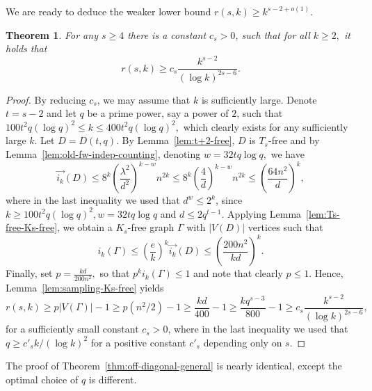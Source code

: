 \documentclass{article}
\theoremstyle{plain}
\newtheorem{theorem}{Theorem}[section]
\theoremstyle{definition}
\newcommand{\fwi}[1]{\overrightarrow{i_{#1}}}
\begin{document}
We are ready to deduce the weaker lower bound $r(s, k) \ge k^{s-2+o(1)}$.

\begin{theorem} \label{thm:s-2}
    For any $s \ge 4$ there is a constant $c_s > 0$, such that for all $k \ge 2,$ it holds that
    \[ r(s, k) \ge c_s \frac{k^{s-2}}{(\log k)^{2s-6}}. \]
\end{theorem}
\begin{proof}
    By reducing $c_s$, we may assume that $k$ is sufficiently large. Denote $t = s-2$ and let $q$ be a prime power, say a power of $2$, such that $100t^2 q (\log q)^2 \le k \le 400 t^2 q (\log q)^2,$ which clearly exists for any sufficiently large $k$. Let $D = D(t, q)$. By Lemma~\ref{lem:t+2-free}, $D$ is $T_s$-free and by Lemma~\ref{lem:old-fw-indep-counting}, denoting $w = 32t q \log q,$ we have
    \[ \fwi{k}(D) \le 8^k \left(\frac{\lambda^2}{d^2}\right)^{k - w} n^{2k} \le 8^k \left(\frac{4}{d}\right)^{k-w} n^{2k} \le \left( \frac{64 n^2}{d}\right)^k, \]
    where in the last inequality we used that $d^w \le 2^k$, since $k \ge 100 t^2 q (\log q)^2, w = 32 t q \log q$ and $d \le 2q^{t-1}$. 
    Applying Lemma~\ref{lem:Ts-free-Ks-free}, we obtain a $K_s$-free graph $\Gamma$ with $|V(D)|$ vertices such that 
    \[ i_k(\Gamma) \le \left( \frac{e}{k}\right)^k \fwi{k}(D) \le \left(\frac{200 n^2}{kd}\right)^k. \]
    Finally, set $p = \frac{kd}{200 n^2},$ so that $p^k i_k(\Gamma) \le 1$ and note that clearly $p \le 1$. Hence, Lemma~\ref{lem:sampling-Ks-free} yields
    \[ r(s, k) \ge p |V(\Gamma)| - 1 \ge p (n^2 / 2) - 1 \ge \frac{kd}{400} - 1 \ge \frac{k q^{s-3}}{800} - 1 \ge c_s \frac{k^{s-2}}{(\log k)^{2s-6}}, \]
    for a sufficiently small constant $c_s>0$, where in the last inequality we used that $q \ge c'_s k / (\log k)^2$ for a positive constant $c'_s$ depending only on $s$.
\end{proof}

The proof of Theorem~\ref{thm:off-diagonal-general} is nearly identical, except the optimal choice of $q$ is different.
\end{document}
